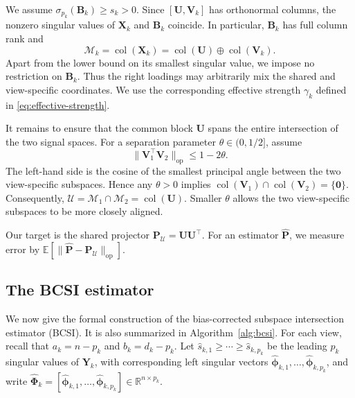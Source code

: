 \documentclass[11pt]{article}
\newcommand{\trans}{\top}
\newcommand{\cU}{\mathcal{U}}
\newcommand{\cM}{\mathcal{M}}
\begin{document}
We assume
$\sigma_{p_k}(\bm B_k)\ge s_k>0$.
Since $[\bm U,\bm V_k]$ has orthonormal columns, the nonzero singular
values of $\bm X_k$ and $\bm B_k$ coincide. In particular,
$\bm B_k$ has full column rank and
\[
  \cM_k
  =
  \operatorname{col}(\bm X_k)
  =
  \operatorname{col}(\bm U)
  \oplus
  \operatorname{col}(\bm V_k).
\]
Apart from the lower bound on its smallest singular value, we impose no
restriction on $\bm B_k$. Thus the right loadings may arbitrarily mix the
shared and view-specific coordinates. We use the corresponding effective
strength $\gamma_k$ defined in \cref{eq:effective-strength}.

It remains to ensure that the common block $\bm U$ spans the entire
intersection of the two signal spaces. For a separation parameter
$\theta\in(0,1/2]$, assume
\begin{equation}
\label{eq:misalign}
  \|\bm V_1^\trans\bm V_2\|_{\mathrm{op}}
  \le 1-2\theta.
\end{equation}
The left-hand side is the cosine of the smallest principal angle between
the two view-specific subspaces. Hence any $\theta>0$ implies
$\operatorname{col}(\bm V_1)\cap
\operatorname{col}(\bm V_2)=\{\bm 0\}$.
Consequently,
$\cU=\cM_1\cap\cM_2=\operatorname{col}(\bm U)$.
Smaller $\theta$ allows the two view-specific subspaces to be more closely
aligned.

Our target is the shared projector
$\bm P_{\cU}=\bm U\bm U^\trans$.
For an estimator $\widehat{\bm P}$, we measure error by
$\mathbb{E}[\|\widehat{\bm P}-\bm P_{\cU}\|_{\mathrm{op}}]$.


\subsection{The BCSI estimator}
\label{sec:bcsi-estimator}




We now give the formal construction of the bias-corrected subspace
intersection estimator (BCSI). It is also summarized in Algorithm~\ref{alg:bcsi}.
For each view, recall that
$a_k=n-p_k$ and $b_k=d_k-p_k$.
Let
$\widehat s_{k,1}\ge\cdots\ge\widehat s_{k,p_k}$ be the leading
$p_k$ singular values of $\bm Y_k$, with corresponding left singular vectors
$\widehat{\bm\phi}_{k,1},\ldots,\widehat{\bm\phi}_{k,p_k}$, and write
$\widehat{\bm\Phi}_k
=[\widehat{\bm\phi}_{k,1},\ldots,\widehat{\bm\phi}_{k,p_k}]
\in\mathbb R^{n\times p_k}$.
\end{document}
